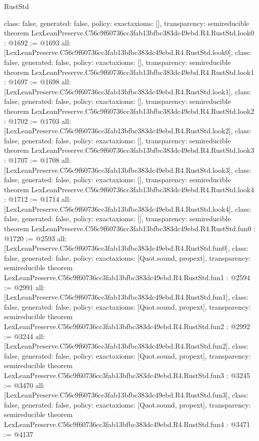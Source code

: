 \begin{lexlean}{RustStd}
\begin{coremodule}
{  class: false,
  generated: false,
  policy: exact{axioms: []},
  transparency: semireducible
}
theorem LexLeanPreserve.C56c9f60736cc3fab13bfbc383dc49ebd.R4.RustStd.look0 : @1692 := @1693 {
  all: [LexLeanPreserve.C56c9f60736cc3fab13bfbc383dc49ebd.R4.RustStd.look0],
  class: false,
  generated: false,
  policy: exact{axioms: []},
  transparency: semireducible
}
theorem LexLeanPreserve.C56c9f60736cc3fab13bfbc383dc49ebd.R4.RustStd.look1 : @1697 := @1698 {
  all: [LexLeanPreserve.C56c9f60736cc3fab13bfbc383dc49ebd.R4.RustStd.look1],
  class: false,
  generated: false,
  policy: exact{axioms: []},
  transparency: semireducible
}
theorem LexLeanPreserve.C56c9f60736cc3fab13bfbc383dc49ebd.R4.RustStd.look2 : @1702 := @1703 {
  all: [LexLeanPreserve.C56c9f60736cc3fab13bfbc383dc49ebd.R4.RustStd.look2],
  class: false,
  generated: false,
  policy: exact{axioms: []},
  transparency: semireducible
}
theorem LexLeanPreserve.C56c9f60736cc3fab13bfbc383dc49ebd.R4.RustStd.look3 : @1707 := @1708 {
  all: [LexLeanPreserve.C56c9f60736cc3fab13bfbc383dc49ebd.R4.RustStd.look3],
  class: false,
  generated: false,
  policy: exact{axioms: []},
  transparency: semireducible
}
theorem LexLeanPreserve.C56c9f60736cc3fab13bfbc383dc49ebd.R4.RustStd.look4 : @1712 := @1714 {
  all: [LexLeanPreserve.C56c9f60736cc3fab13bfbc383dc49ebd.R4.RustStd.look4],
  class: false,
  generated: false,
  policy: exact{axioms: []},
  transparency: semireducible
}
theorem LexLeanPreserve.C56c9f60736cc3fab13bfbc383dc49ebd.R4.RustStd.fun0 : @1720 := @2593 {
  all: [LexLeanPreserve.C56c9f60736cc3fab13bfbc383dc49ebd.R4.RustStd.fun0],
  class: false,
  generated: false,
  policy: exact{axioms: [Quot.sound, propext]},
  transparency: semireducible
}
theorem LexLeanPreserve.C56c9f60736cc3fab13bfbc383dc49ebd.R4.RustStd.fun1 : @2594 := @2991 {
  all: [LexLeanPreserve.C56c9f60736cc3fab13bfbc383dc49ebd.R4.RustStd.fun1],
  class: false,
  generated: false,
  policy: exact{axioms: [Quot.sound, propext]},
  transparency: semireducible
}
theorem LexLeanPreserve.C56c9f60736cc3fab13bfbc383dc49ebd.R4.RustStd.fun2 : @2992 := @3244 {
  all: [LexLeanPreserve.C56c9f60736cc3fab13bfbc383dc49ebd.R4.RustStd.fun2],
  class: false,
  generated: false,
  policy: exact{axioms: [Quot.sound, propext]},
  transparency: semireducible
}
theorem LexLeanPreserve.C56c9f60736cc3fab13bfbc383dc49ebd.R4.RustStd.fun3 : @3245 := @3470 {
  all: [LexLeanPreserve.C56c9f60736cc3fab13bfbc383dc49ebd.R4.RustStd.fun3],
  class: false,
  generated: false,
  policy: exact{axioms: [Quot.sound, propext]},
  transparency: semireducible
}
theorem LexLeanPreserve.C56c9f60736cc3fab13bfbc383dc49ebd.R4.RustStd.fun4 : @3471 := @4137 {
}
\end{coremodule}
\end{lexlean}

